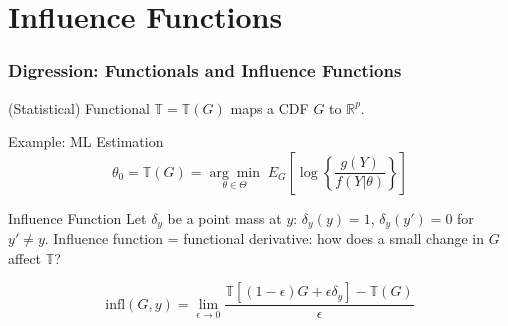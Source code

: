 \section{Influence Functions}
\begin{frame}
  \frametitle{Digression: Functionals and Influence Functions}

  \begin{block}{(Statistical) Functional}
    $\mathbb{T}=\mathbb{T}(G)$ maps a CDF $G$ to $\mathbb{R}^p$.
  \end{block}

  \pause

  \begin{block}{Example: ML Estimation}
    \vspace{-2em}
    \[\theta_0 = \mathbb{T}(G) = \underset{\theta \in \Theta}{\arg \min} \;E_G\left[\log\left\{\frac{g(Y)}{f(Y|\theta)} \right\} \right]\]
  \end{block}

  \pause

  \begin{block}{Influence Function}
    Let $\delta_y$ be a \alert{point mass} at $y$: $\delta_y(y) = 1$, $\delta_y(y')=0$ for $y'\neq y$.
    Influence function = functional derivative: how does a small change in $G$ affect $\mathbb{T}$?

    \[\text{infl}(G,y) = \lim_{\epsilon \rightarrow 0} \frac{\mathbb{T}\left[\left(1-\epsilon\right)G + \epsilon \delta_y\right] - \mathbb{T}(G)}{\epsilon}\]
  \end{block}
\end{frame}
